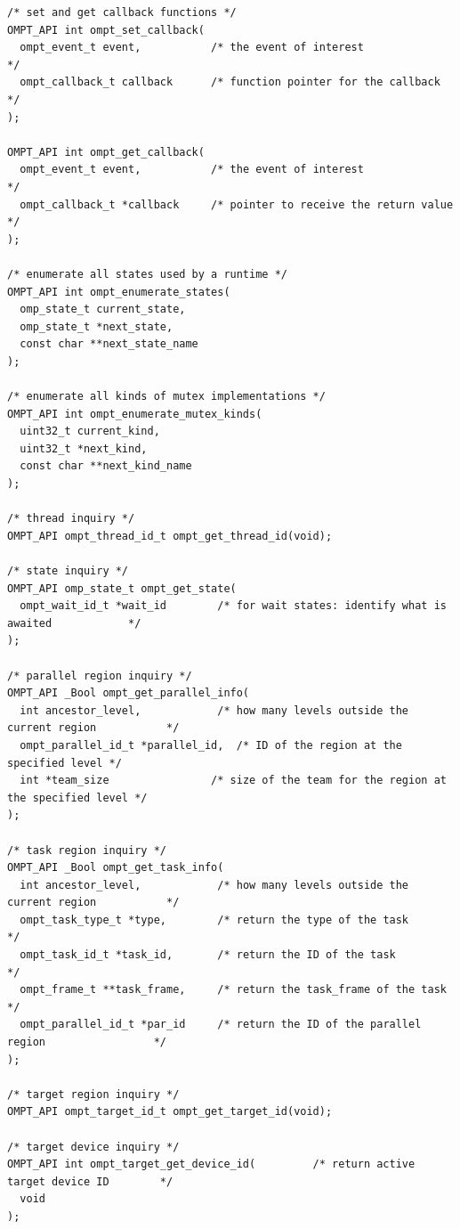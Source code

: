 \documentclass{article}
\begin{document}
\begin{verbatim}
/* set and get callback functions */
OMPT_API int ompt_set_callback( 
  ompt_event_t event,           /* the event of interest                                 */
  ompt_callback_t callback      /* function pointer for the callback                     */
);

OMPT_API int ompt_get_callback(
  ompt_event_t event,           /* the event of interest                                 */
  ompt_callback_t *callback     /* pointer to receive the return value                   */
);

/* enumerate all states used by a runtime */
OMPT_API int ompt_enumerate_states(  
  omp_state_t current_state,   
  omp_state_t *next_state,     
  const char **next_state_name   
);

/* enumerate all kinds of mutex implementations */
OMPT_API int ompt_enumerate_mutex_kinds(  
  uint32_t current_kind, 
  uint32_t *next_kind,   
  const char **next_kind_name    
);

/* thread inquiry */
OMPT_API ompt_thread_id_t ompt_get_thread_id(void);

/* state inquiry */
OMPT_API omp_state_t ompt_get_state( 
  ompt_wait_id_t *wait_id        /* for wait states: identify what is awaited            */
);

/* parallel region inquiry */
OMPT_API _Bool ompt_get_parallel_info(
  int ancestor_level,            /* how many levels outside the current region           */
  ompt_parallel_id_t *parallel_id,  /* ID of the region at the specified level */
  int *team_size                /* size of the team for the region at the specified level */
);

/* task region inquiry */
OMPT_API _Bool ompt_get_task_info(
  int ancestor_level,            /* how many levels outside the current region           */
  ompt_task_type_t *type,        /* return the type of the task                          */
  ompt_task_id_t *task_id,       /* return the ID of the task                            */
  ompt_frame_t **task_frame,     /* return the task_frame of the task                    */
  ompt_parallel_id_t *par_id     /* return the ID of the parallel region                 */
);

/* target region inquiry */
OMPT_API ompt_target_id_t ompt_get_target_id(void);

/* target device inquiry */
OMPT_API int ompt_target_get_device_id(         /* return active target device ID        */
  void
);


\end{verbatim}
\end{document}
